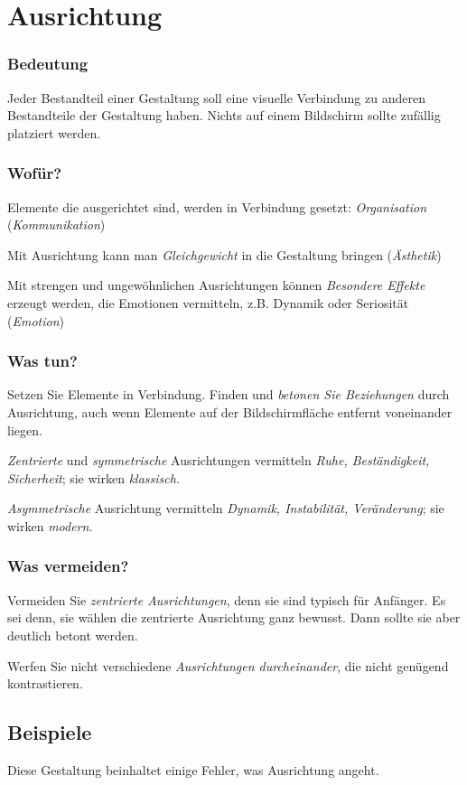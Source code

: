 \section{Ausrichtung}
\subsubsection*{Bedeutung}
Jeder Bestandteil einer Gestaltung soll eine visuelle Verbindung zu anderen Bestandteile der Gestaltung haben. Nichts auf einem Bildschirm sollte zufällig platziert werden. 

\subsubsection*{Wofür?}
Elemente die ausgerichtet sind, werden in Verbindung gesetzt: \emph{Organisation} (\emph{Kommunikation})

Mit Ausrichtung kann man \emph{Gleichgewicht} in die Gestaltung bringen (\emph{Ästhetik})

Mit strengen und ungewöhnlichen Ausrichtungen können \emph{Besondere Effekte} erzeugt werden, die Emotionen vermitteln, z.B. Dynamik oder Seriosität (\emph{Emotion})

\subsubsection*{Was tun?}
Setzen Sie Elemente in Verbindung. Finden und \emph{betonen Sie Beziehungen} durch Ausrichtung, auch wenn Elemente auf der Bildschirmfläche entfernt voneinander liegen.

\emph{Zentrierte} und \emph{symmetrische} Ausrichtungen vermitteln \emph{Ruhe, Beständigkeit, Sicherheit}; sie wirken \emph{klassisch}.

\emph{Asymmetrische} Ausrichtung vermitteln \emph{Dynamik, Instabilität, Veränderung}; sie wirken \emph{modern}.

\subsubsection*{Was vermeiden?}
Vermeiden Sie \emph{zentrierte Ausrichtungen}, denn sie sind typisch für Anfänger. Es sei denn, sie wählen die zentrierte Ausrichtung ganz bewusst. Dann sollte sie aber deutlich betont werden.

Werfen Sie nicht verschiedene \emph{Ausrichtungen durcheinander}, die nicht genügend kontrastieren.

\subsection{Beispiele}
Diese Gestaltung beinhaltet einige Fehler, was Ausrichtung angeht.\bigskip

